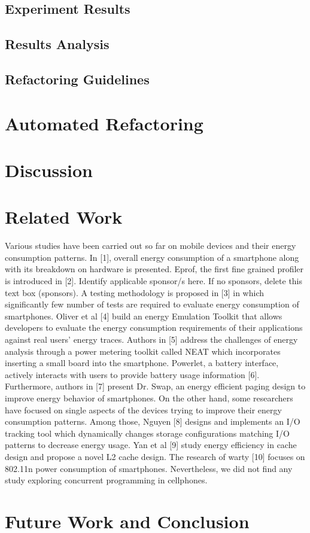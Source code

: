\documentclass[conference,10pt]{IEEEtran}
\begin{document}
\subsection{Experiment Results}
\subsection{Results Analysis}
\subsection{Refactoring Guidelines}

\section{Automated Refactoring} 

\section{Discussion}

\section{Related Work}
Various studies have been carried out so far on mobile devices and their energy consumption patterns. In [1], overall energy consumption of a smartphone along with its breakdown on hardware is presented. Eprof, the first fine grained profiler is introduced in [2]. 
Identify applicable sponsor/s here. If no sponsors, delete this text box (sponsors).
A testing methodology is proposed in [3] in which significantly few number of tests are required to evaluate energy consumption of smartphones. Oliver et al [4] build an energy Emulation Toolkit that allows developers to evaluate the energy consumption requirements of their applications against real users’ energy traces. Authors in [5] address the challenges of energy analysis through a power metering toolkit called NEAT which incorporates inserting a small board into the smartphone.
Powerlet, a battery interface, actively interacts with users to provide battery usage information [6]. Furthermore, authors in [7] present Dr. Swap, an energy efficient paging design to improve energy behavior of smartphones.
On the other hand, some researchers have focused on single aspects of the devices trying to improve their energy consumption patterns. Among those, Nguyen [8] designs and implements an I/O tracking tool which dynamically changes storage configurations matching I/O patterns to decrease energy usage. Yan et al [9] study energy efficiency in cache design and propose a novel L2 cache design. The research of warty [10] focuses on 802.11n power consumption of smartphones.
Nevertheless, we did not find any study exploring concurrent programming in cellphones.    


\section{Future Work and Conclusion}

%
%
\end{document}
